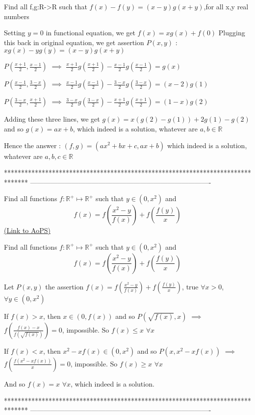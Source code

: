 \begin{solution}
	\begin{tcolorbox}Find all f,g:R->R such that $f(x)-f(y)=(x-y)g(x+y)$,for all x,y real numbers\end{tcolorbox}
Setting $y=0$ in functional equation, we get $f(x)=xg(x)+f(0)$
Plugging this back in original equation, we get assertion $P(x,y)$ : $xg(x)-yg(y)=(x-y)g(x+y)$

$P(\frac{x+1}2,\frac{x-1}2)$ $\implies$ $\frac{x+1}2g(\frac{x+1}2)-\frac{x-1}2g(\frac{x-1}2)=g(x)$

$P(\frac{x-1}2,\frac{3-x}2)$ $\implies$ $\frac{x-1}2g(\frac{x-1}2)-\frac{3-x}2g(\frac{3-x}2)=(x-2)g(1)$

$P(\frac{3-x}2,\frac{x+1}2)$ $\implies$ $\frac{3-x}2g(\frac{3-x}2)-\frac{x+1}2g(\frac{x+1}2)=(1-x)g(2)$

Adding these three lines, we get $g(x)=x(g(2)-g(1))+2g(1)-g(2)$ and so $g(x)=ax+b$, which indeed is a solution, whatever are $a,b\in\mathbb R$

Hence the answer : $\boxed{(f,g)=(ax^2+bx+c,ax+b)}$ which indeed is a solution, whatever are $a,b,c\in\mathbb R$
\end{solution}
*******************************************************************************
-------------------------------------------------------------------------------

\begin{problem}
	Find all functions $ f :\mathbb{R}^+\mapsto\mathbb{R}^+ $ such that $y\in{(0,x^{2})}$ and
\[f(x)=f(\frac{x^{2}-y}{f(x)})+f(\frac{f(y)}{x})\]
	\flushright \href{https://artofproblemsolving.com/community/c6h578815}{(Link to AoPS)}
\end{problem}



\begin{solution}
	\begin{tcolorbox}Find all functions $ f :\mathbb{R}^+\mapsto\mathbb{R}^+ $ such that $y\in{(0,x^{2})}$ and
\[f(x)=f(\frac{x^{2}-y}{f(x)})+f(\frac{f(y)}{x})\]\end{tcolorbox}
Let $P(x,y)$ the assertion $f(x)=f\left(\frac{x^2-y}{f(x)}\right)+f\left(\frac{f(y)}x\right)$, true $\forall x>0$, $\forall y\in(0,x^2)$

If $f(x)>x$, then $x\in(0,f(x))$ and so $P(\sqrt{f(x)},x)$ $\implies$ $f\left(\frac{f(x)-x}{f(\sqrt{f(x)})}\right)=0$, impossible. So $f(x)\le x$ $\forall x$

If $f(x)<x$, then $x^2-xf(x)\in(0,x^2)$ and so $P(x,x^2-xf(x))$ $\implies$ $f\left(\frac{f(x^2-xf(x))}x\right)=0$, impossible. So $f(x)\ge x$ $\forall x$

And so $\boxed{f(x)=x}$ $\forall x$, which indeed is a solution.
\end{solution}
*******************************************************************************
-------------------------------------------------------------------------------


